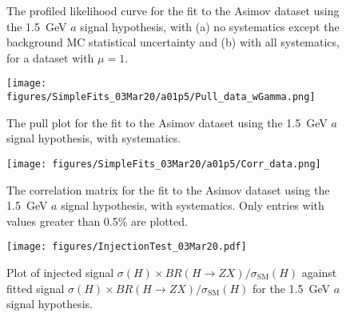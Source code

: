 \documentclass[NOTE, atlasdraft=true, texlive=2017, UKenglish]{\ATLASLATEXPATH atlasdoc}
\begin{document}
\begin{figure}[!htbp]
  \centering
  \caption{The profiled likelihood curve for the fit to the Asimov dataset using the 1.5~GeV $a$ signal hypothesis, with (a) no systematics except the background MC statistical uncertainty and (b) with all systematics, for a dataset with $\mu=1$.}
  \label{fig:likelihood}
\end{figure}

\begin{figure}[!htbp]
  \centering
  \texttt{[image: figures/SimpleFits\_03Mar20/a01p5/Pull\_data\_wGamma.png]}
  \caption{The pull plot for the fit to the Asimov dataset using the 1.5~GeV $a$ signal hypothesis, with systematics.}
  \label{fig:pulls}
\end{figure}

\begin{figure}[!htbp]
  \centering
  \texttt{[image: figures/SimpleFits\_03Mar20/a01p5/Corr\_data.png]}
  \caption{The correlation matrix for the fit to the Asimov dataset using the 1.5~GeV $a$ signal hypothesis, with systematics. Only entries with values greater than 0.5\% are plotted.}
  \label{fig:corr}
\end{figure}

\begin{figure}[!htbp]
  \centering
  \texttt{[image: figures/InjectionTest\_03Mar20.pdf]}
  \caption{Plot of injected signal $\sigma(H)\times BR(H\to ZX)/\sigma_\text{SM}(H)$ against fitted signal $\sigma(H)\times BR(H\to ZX)/\sigma_\text{SM}(H)$ for the 1.5~GeV $a$ signal hypothesis.}
  \label{fig:injectiontest}
\end{figure}



\end{document}

